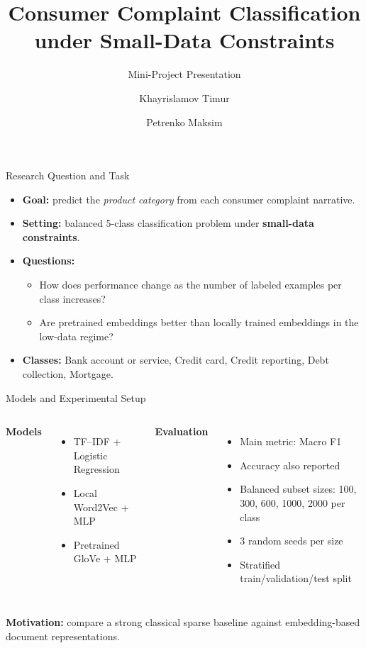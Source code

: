 \documentclass[aspectratio=169,10pt]{beamer}
\title{Consumer Complaint Classification under Small-Data Constraints}
\subtitle{Mini-Project Presentation}
\author{Khayrislamov Timur \and Petrenko Maksim}
\institute{Natural Language Processing (NLP) in Python}
\date{}
\begin{document}
\begin{frame}
  \titlepage
\end{frame}

\begin{frame}{Research Question and Task}
\begin{itemize}
    \item \textbf{Goal:} predict the \textit{product category} from each consumer complaint narrative.
    \item \textbf{Setting:} balanced 5-class classification problem under \textbf{small-data constraints}.
    \item \textbf{Questions:}
    \begin{itemize}
        \item How does performance change as the number of labeled examples per class increases?
        \item Are pretrained embeddings better than locally trained embeddings in the low-data regime?
    \end{itemize}
    \item \textbf{Classes:} Bank account or service, Credit card, Credit reporting, Debt collection, Mortgage.
\end{itemize}
\end{frame}

\begin{frame}{Models and Experimental Setup}
\begin{columns}[T,totalwidth=\textwidth]
\textbf{Models}
\begin{itemize}
    \item TF--IDF + Logistic Regression
    \item Local Word2Vec + MLP
    \item Pretrained GloVe + MLP
\end{itemize}

\textbf{Evaluation}
\begin{itemize}
    \item Main metric: Macro F1
    \item Accuracy also reported
    \item Balanced subset sizes: 100, 300, 600, 1000, 2000 per class
    \item 3 random seeds per size
    \item Stratified train/validation/test split
\end{itemize}
\end{columns}

\vspace{0.35cm}
\textbf{Motivation:} compare a strong classical sparse baseline against embedding-based document representations.
\end{frame}
\end{document}
